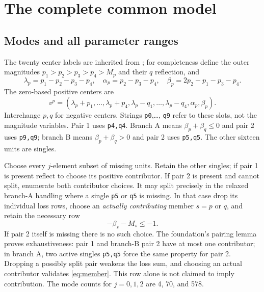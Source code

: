 \documentclass[11pt,a4paper]{article}
\begin{document}
\section{The complete common model}
\subsection{Modes and all parameter ranges}
The twenty center labels are inherited from \cite{base99,base98}; for
completeness define the outer magnitudes
$p_1>p_2>p_3>p_4>M_p$ and their $q$ reflection, and
\[
 \lambda_p=p_1-p_2-p_3-p_4,\quad
 \alpha_p=p_2-p_3-p_4,\quad\beta_p=2p_2-p_1-p_3-p_4.
\]
The zero-based positive centers are
\[
 v^p=(\lambda_p+p_1,\ldots,\lambda_p+p_4,
       \lambda_p-q_1,\ldots,\lambda_p-q_4,\alpha_p,\beta_p).
\]
Interchange $p,q$ for negative centers. Strings \texttt{p0},\ldots,
\texttt{q9} refer to these slots, not the magnitude variables.
Pair 1 uses \texttt{p4,q4}. Branch A means $\beta_p+\beta_q\le0$ and
pair 2 uses \texttt{p9,q9}; branch B means $\beta_p+\beta_q>0$ and
pair 2 uses \texttt{p5,q5}. The other sixteen units are singles.

Choose every $j$-element subset of missing units. Retain the other
singles; if pair 1 is present reflect to choose its positive contributor.
If pair 2 is present and cannot split, enumerate both contributor choices.
It may split precisely in the relaxed branch-A handling where a single
\texttt{p5} or \texttt{q5} is missing. In that case drop its individual
loss rows, choose an \emph{actually contributing} member $s=p$ or $q$,
and retain the necessary row
\begin{equation}\label{eq:member}
 -\beta_s-M_s\le-1.
\end{equation}
If pair 2 itself is missing there is no such choice. The foundation's
pairing lemma proves exhaustiveness: pair 1 and branch-B pair 2 have at
most one contributor; in branch A, two active singles \texttt{p5,q5}
force the same property for pair 2. Dropping a possibly split pair
weakens the loss sum, and choosing an actual contributor validates
\eqref{eq:member}. This row alone is not claimed to imply contribution.
The mode counts for $j=0,1,2$ are 4, 70, and 578.
\end{document}
